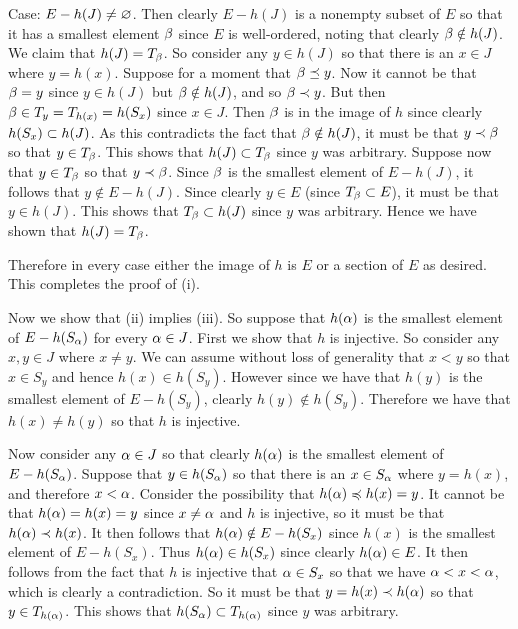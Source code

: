 {{    Case: $E - h(J) \neq \es$.
    Then clearly $E - h(J)$ is a nonempty subset of $E$ so that it has a smallest element $\b$ since $E$ is well-ordered, noting that clearly $\b \notin h(J)$.
    We claim that $h(J) = T_\b$.
    So consider any $y \in h(J)$ so that there is an $x \in J$ where $y = h(x)$.
    Suppose for a moment that $\b \eprec y$.
    Now it cannot be that $\b = y$ since $y \in h(J)$ but $\b \notin h(J)$, and so $\b \prec y$.
    But then $\b \in T_y = T_{h(x)} = h(S_x)$ since $x \in J$.
    Then $\b$ is in the image of $h$ since clearly $h(S_x) \ss h(J)$.
    As this contradicts the fact that $\b \notin h(J)$, it must be that $y \prec \b$ so that $y \in T_\b$.
    This shows that $h(J) \ss T_\b$ since $y$ was arbitrary.
    Suppose now that $y \in T_\b$ so that $y \prec \b$.
    Since $\b$ is the smallest element of $E - h(J)$, it follows that $y \notin E - h(J)$.
    Since clearly $y \in E$ (since $T_\b \ss E$), it must be that $y \in h(J)$.
    This shows that $T_\b \ss h(J)$ since $y$ was arbitrary.
    Hence we have shown that $h(J) = T_\b$.

    Therefore in every case either the image of $h$ is $E$ or a section of $E$ as desired.
    This completes the proof of (i).

    Now we show that (ii) implies (iii).
    So suppose that $h(\a)$ is the smallest element of $E - h(S_\a)$ for every $\a \in J$.
    First we show that $h$ is injective.
    So consider any $x,y \in J$ where $x \neq y$.
    We can assume without loss of generality that $x < y$ so that $x \in S_y$ and hence $h(x) \in h(S_y)$.
    However since we have that $h(y)$ is the smallest element of $E - h(S_y)$, clearly $h(y) \notin h(S_y)$.
    Therefore we have that $h(x) \neq h(y)$ so that $h$ is injective.
    
    Now consider any $\a \in J$ so that clearly $h(\a)$ is the smallest element of $E - h(S_\a)$.
    Suppose that $y \in h(S_\a)$ so that there is an $x \in S_\a$ where $y = h(x)$, and therefore $x < \a$.
    Consider the possibility that $h(\a) \prece h(x) = y$.
    It cannot be that $h(\a) = h(x) = y$ since $x \neq \a$ and $h$ is injective, so it must be that $h(\a) \prec h(x)$.
    It then follows that $h(\a) \notin E - h(S_x)$ since $h(x)$ is the smallest element of $E - h(S_x)$.
    Thus $h(\a) \in h(S_x)$ since clearly $h(\a) \in E$.
    It then follows from the fact that $h$ is injective that $\a \in S_x$ so that we have $\a < x < \a$, which is clearly a contradiction.
    So it must be that $y = h(x) \prec h(\a)$ so that $y \in T_{h(\a)}$.
    This shows that $h(S_\a) \ss T_{h(\a)}$ since $y$ was arbitrary.
        
}}
